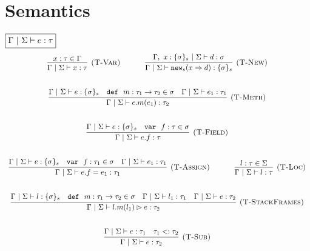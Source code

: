 \documentclass{llncs}
\newcommand{\keywadj}[1]{\mathtt{#1}}
\newcommand{\keyw}[1]{\keywadj{#1}~}
\begin{document}
\newpage

\section{Semantics}

$\fbox{$\Gamma~|~\Sigma \vdash e : \tau$}$
\[
\begin{array}{c}
\infer[\textsc{(T-Var)}]
  {\Gamma~|~\Sigma \vdash x : \tau}
  {x : \tau \in \Gamma}%
~~~~~~~~~~
\infer[\textsc{(T-New)}]
	{\Gamma~|~\Sigma \vdash \keywadj{new}_{s}(x \Rightarrow d) : \{ \sigma \}_{s}}
	{\Gamma,~x : \{ \sigma \}_{s}~|~\Sigma \vdash d : \sigma} \\[5ex]

\infer[\textsc{(T-Meth)}]
	{\Gamma~|~\Sigma \vdash e.m(e_1) : \tau_2} 
	{\Gamma~|~\Sigma \vdash e : \{\sigma\}_s  & \keyw{def}~ m : \tau_1 \rightarrow \tau_2 \in \sigma & \Gamma~|~\Sigma \vdash e_1 : \tau_1}\\[5ex]

\infer[\textsc{(T-Field)}]
	{\Gamma~|~\Sigma \vdash  e.f : \tau} 
	{\Gamma~|~\Sigma \vdash e : \{\sigma\}_s & \keyw{var}~ f : \tau \in \sigma}\\[5ex]
	
\infer[\textsc{(T-Assign)}]
	{\Gamma~|~\Sigma \vdash  e.f=e_1 : \tau_1} 
	{\Gamma~|~\Sigma \vdash e : \{\sigma\}_s & \keyw{var}~ f:\tau_1 \in \sigma & \Gamma~|~\Sigma \vdash e_1 : \tau_1 }%
~~~~~~~~~~
\infer[\textsc{(T-Loc)}]
  {\Gamma~|~\Sigma \vdash l : \tau}
  {l : \tau \in \Sigma}\\[5ex]

\infer[\textsc{(T-StackFrames)}]
	{\Gamma~|~\Sigma \vdash l.m(l_1) \rhd e : \tau_2}
	{\Gamma~|~\Sigma \vdash l : \{\sigma\}_s & \keyw{def}~ m : \tau_1 \rightarrow \tau_2 \in \sigma & \Gamma~|~\Sigma \vdash l_1 : \tau_1 & \Gamma~|~\Sigma \vdash e : \tau_2} \\[5ex]

\infer[\textsc{(T-Sub)}]
  {\Gamma~|~\Sigma \vdash e : \tau_2}
  {\Gamma~|~\Sigma \vdash e : \tau_1 & \tau_1 <: \tau_2}\\[5ex]

\end{array}
\]
\end{document}

